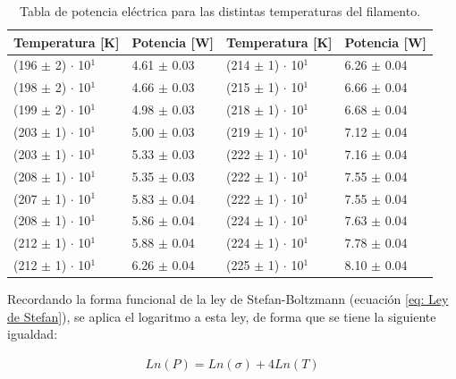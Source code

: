 \documentclass[%
 reprint,
 amsmath,amssymb,
 aps,
]{revtex4-2}
\begin{document}
\begin{table}[H]
    \centering
    \begin{tabular}{l|l||l|l}
        \toprule
        \toprule
        Temperatura [K] & Potencia [W] & Temperatura [K] & Potencia [W] \\
        \midrule
        (196 $\pm$ 2) $\cdot$ 10$^{1}$  &  4.61 $\pm$ 0.03 & (214 $\pm$ 1) $\cdot$ 10$^{1}$  &  6.26 $\pm$ 0.04 \\
        (198 $\pm$ 2) $\cdot$ 10$^{1}$  &  4.66 $\pm$ 0.03 & (215 $\pm$ 1) $\cdot$ 10$^{1}$  &  6.66 $\pm$ 0.04 \\
        (199 $\pm$ 2) $\cdot$ 10$^{1}$  &  4.98 $\pm$ 0.03 & (218 $\pm$ 1) $\cdot$ 10$^{1}$  &  6.68 $\pm$ 0.04\\
        (203 $\pm$ 1) $\cdot$ 10$^{1}$  &  5.00 $\pm$ 0.03 & (219 $\pm$ 1) $\cdot$ 10$^{1}$  &  7.12 $\pm$ 0.04\\
        (203 $\pm$ 1) $\cdot$ 10$^{1}$  &  5.33 $\pm$ 0.03 & (222 $\pm$ 1) $\cdot$ 10$^{1}$  &  7.16 $\pm$ 0.04\\
        (208 $\pm$ 1) $\cdot$ 10$^{1}$  &  5.35 $\pm$ 0.03 & (222 $\pm$ 1) $\cdot$ 10$^{1}$  &  7.55 $\pm$ 0.04 \\
        (207 $\pm$ 1) $\cdot$ 10$^{1}$  &  5.83 $\pm$ 0.04 & (222 $\pm$ 1) $\cdot$ 10$^{1}$  &  7.55 $\pm$ 0.04\\
        (208 $\pm$ 1) $\cdot$ 10$^{1}$  &  5.86 $\pm$ 0.04 & (224 $\pm$ 1) $\cdot$ 10$^{1}$  &  7.63 $\pm$ 0.04\\
        (212 $\pm$ 1) $\cdot$ 10$^{1}$  &  5.88 $\pm$ 0.04 & (224 $\pm$ 1) $\cdot$ 10$^{1}$  &  7.78 $\pm$ 0.04\\
        (212 $\pm$ 1) $\cdot$ 10$^{1}$  &  6.26 $\pm$ 0.04 & (225 $\pm$ 1) $\cdot$ 10$^{1}$  &  8.10 $\pm$ 0.04\\
        \bottomrule
        \bottomrule

    \end{tabular}
    \caption{Tabla de potencia eléctrica para las distintas temperaturas del filamento.}
    \label{tab: Potencia eléctrica}
\end{table}

\vspace{0.2 cm}
Recordando la forma funcional de la ley de Stefan-Boltzmann (ecuación \ref{eq: Ley de Stefan}), se aplica el logaritmo a esta ley, de forma que se tiene la siguiente igualdad:

\begin{align*}
    Ln(P) = Ln(\sigma) + 4Ln(T)
\end{align*}
\end{document}

